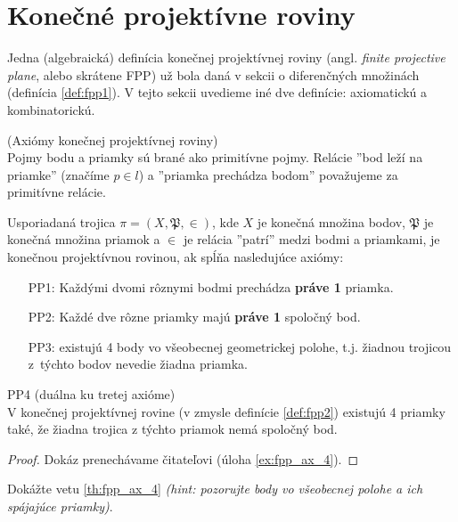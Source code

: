 
\section{Konečné projektívne roviny}

Jedna (algebraická) definícia konečnej projektívnej roviny (angl. \emph{finite projective plane}, alebo skrátene FPP) 
už bola daná v sekcii o diferenčných množinách (definícia \ref{def:fpp1}). V tejto sekcii uvedieme iné dve definície: 
axiomatickú a kombinatorickú.


\begin{definition}{(Axiómy konečnej projektívnej roviny)}\\
\label{def:fpp2}
Pojmy bodu a priamky sú brané ako primitívne pojmy. 
Relácie ''bod leží na priamke'' (značíme $p \in l$) a ''priamka prechádza bodom'' považujeme za primitívne relácie.

Usporiadaná trojica $\pi = (X, \mathfrak{P}, \in)$, kde $X$ je konečná množina bodov, $\mathfrak{P}$ je konečná množina priamok a $\in$ je relácia ''patrí'' medzi bodmi a priamkami, je konečnou projektívnou rovinou, ak spĺňa nasledujúce axiómy:
\begin{enumerate}
    \item[PP1:] Každými dvomi rôznymi bodmi prechádza \textbf{práve 1} priamka.
    \item[PP2:] Každé dve rôzne priamky majú \textbf{práve 1} spoločný bod.
    \item[PP3:] existujú 4 body vo všeobecnej geometrickej polohe, t.j. žiadnou trojicou
    z~týchto bodov nevedie žiadna priamka.
\end{enumerate}
\end{definition}

\begin{theorem}{PP4 (duálna ku tretej axióme)}\\
\label{th:fpp_ax_4}
V konečnej projektívnej rovine (v zmysle definície \ref{def:fpp2}) existujú 4 priamky také,
že žiadna trojica z týchto priamok nemá spoločný bod.
\end{theorem}
\begin{proof}
Dokáz prenechávame čitateľovi (úloha \ref{ex:fpp_ax_4}).
\end{proof}

\begin{exercise}
\label{ex:fpp_ax_4}
Dokážte vetu \ref{th:fpp_ax_4} \emph{(hint: pozorujte body vo všeobecnej polohe a ich spájajúce priamky)}.
\end{exercise}

